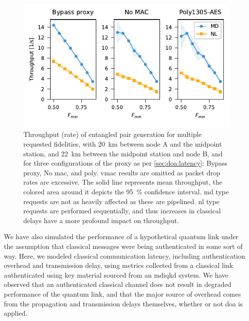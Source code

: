 \begin{figure}[t]
    \centering
    \includegraphics[width=0.6\linewidth]{figures/throughput_FCFS_mhp_150.pdf}
    \caption{
        Throughput (rate) of entangled pair generation for multiple requested fidelities, with
        \qty{20}{\km} between node A and the midpoint station, and \qty{22}{\km} between the
        midpoint station and node B, and for three configurations of the proxy as per
        \cref{sec:doa:latency}: Bypass proxy, No \acrshort{mac}, and \acrshort{poly}. \acrshort{vmac}
        results are omitted as packet drop rates are excessive. The solid line represents mean
        throughput, the colored area around it depicts the \qty{95}{\percent} confidence interval.
        \Acrfull{md} type requests are not as heavily affected as these are pipelined. \Acrfull{nl}
        type requests are performed sequentially, and thus increases in classical delays have a more
        profound impact on throughput.
    }
    \label{fig:results-fidelity}
\end{figure}

We have also simulated the performance of a hypothetical quantum link under the assumption that
classical messages were being authenticated in some sort of way. Here, we modeled classical
communication latency, including authentication overhead and transmission delay, using metrics
collected from a classical link authenticated using key material sourced from an \acrshort{mdiqkd}
system. We have observed that an authenticated classical channel does not result in degraded
performance of the quantum link, and that the major source of overhead comes from the propagation
and transmission delays themselves, whether or not \acrlong{doa} is applied.

\begin{xstretch}
\printbibliography[heading=subbibintoc,title={References},notcategory=noprint]
\end{xstretch}
